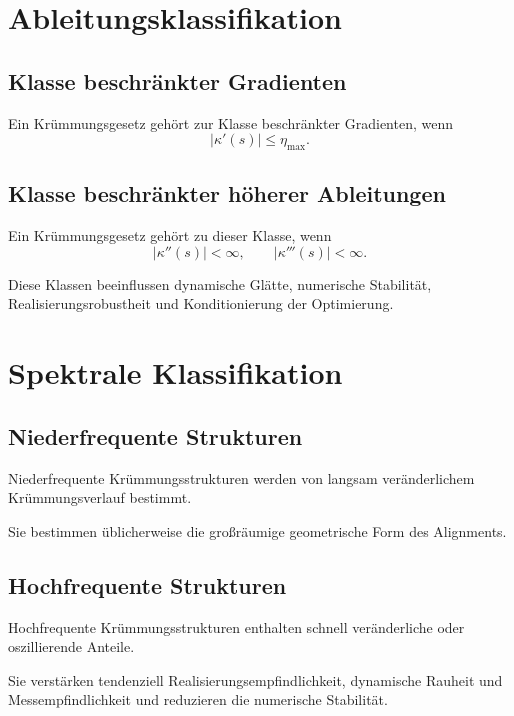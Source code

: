 \section{Ableitungsklassifikation}

\subsection{Klasse beschränkter Gradienten}
\begin{definition}
\label{def:bounded-gradient-class}
Ein Krümmungsgesetz gehört zur Klasse beschränkter Gradienten, wenn
\[
|\kappa'(s)|\le\eta_{\max}.
\]
\end{definition}

\subsection{Klasse beschränkter höherer Ableitungen}
\begin{definition}
\label{def:bounded-higher-derivative-class}
Ein Krümmungsgesetz gehört zu dieser Klasse, wenn
\[
|\kappa''(s)|<\infty,\qquad |\kappa'''(s)|<\infty.
\]
\end{definition}
Diese Klassen beeinflussen dynamische Glätte, numerische Stabilität,
Realisierungsrobustheit und Konditionierung der Optimierung.

\section{Spektrale Klassifikation}

\subsection{Niederfrequente Strukturen}
\begin{definition}
\label{def:low-frequency-curvature-class}
Niederfrequente Krümmungsstrukturen werden von langsam veränderlichem
Krümmungsverlauf bestimmt.
\end{definition}
Sie bestimmen üblicherweise die großräumige geometrische Form des Alignments.

\subsection{Hochfrequente Strukturen}
\begin{definition}
\label{def:high-frequency-curvature-class}
Hochfrequente Krümmungsstrukturen enthalten schnell veränderliche oder
oszillierende Anteile.
\end{definition}
Sie verstärken tendenziell Realisierungsempfindlichkeit, dynamische Rauheit
und Messempfindlichkeit und reduzieren die numerische Stabilität.

